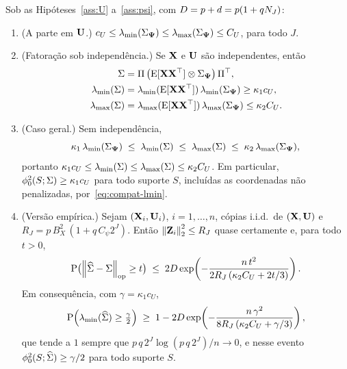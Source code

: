 \documentclass[11pt]{article}
\newcommand{\bPsi}{\boldsymbol{\Psi}}
\newcommand{\kron}{\otimes}
\newcommand{\lmin}{\lambda_{\min}}
\newcommand{\lmax}{\lambda_{\max}}
\newcommand{\opnorm}[1]{\left\lVert #1 \right\rVert_{\mathrm{op}}}
\begin{document}
\begin{proposition}
\label{prop:gram}
Sob as Hipóteses~\ref{ass:U} a~\ref{ass:psi}, com $D = p + d = p(1 + qN_{J})$:
\begin{enumerate}[label=\textup{(\roman*)}, leftmargin=*]
    \item \textup{(A parte em $\mathbf{U}$.)} $c_U \le \lmin(\Gram_{\bPsi}) \le \lmax(\Gram_{\bPsi}) \le C_U$, para todo $J$.
    \item \textup{(Fatoração sob independência.)} Se $\mathbf{X}$ e $\mathbf{U}$ são independentes, então
    \begin{align*}
        \Gram &= \Pi\,\bigl(\E[\bX\bX\T] \kron \Gram_{\bPsi}\bigr)\,\Pi\T , \\
        \lmin(\Gram) &= \lmin(\E[\bX\bX\T])\,\lmin(\Gram_{\bPsi}) \ge \kappa_1 c_U , \\
        \lmax(\Gram) &= \lmax(\E[\bX\bX\T])\,\lmax(\Gram_{\bPsi}) \le \kappa_2 C_U .
    \end{align*}
    \item \textup{(Caso geral.)} Sem independência,
    \[
        \kappa_1\, \lmin(\Gram_{\bPsi}) \;\le\; \lmin(\Gram) \;\le\; \lmax(\Gram) \;\le\; \kappa_2\, \lmax(\Gram_{\bPsi}),
    \]
    portanto $\kappa_1 c_U \le \lmin(\Gram) \le \lmax(\Gram) \le \kappa_2 C_U$.
    Em particular, $\phi_{0}^2(S; \Sigma) \ge \kappa_1 c_U$ para todo suporte $S$, incluídas as coordenadas
    não penalizadas, por~\eqref{eq:compat-lmin}.
    \item \textup{(Versão empírica.)} Sejam $(\mathbf{X}_i, \mathbf{U}_i)$, $i = 1, \ldots, n$, cópias i.i.d.\ de $(\mathbf{X}, \mathbf{U})$ e
    $R_J = p\,B_X^2\,(1 + q\,C_\psi 2^{J})$. Então $\left\lVert \mathbf{Z}_i \right\rVert_2^2 \le R_J$ quase certamente e, para todo $t > 0$,
    \[
        \Prob\bigl(\opnorm{\Gramhat - \Gram} \ge t\bigr)
        \;\le\; 2D \exp\!\left( - \frac{n\,t^2}{2R_J\,(\kappa_2 C_U + 2t/3)} \right) .
    \]
    Em consequência, com $\gamma = \kappa_1 c_U$,
    \[
        \Prob\Bigl( \lmin(\Gramhat) \ge \tfrac{\gamma}{2} \Bigr)
        \;\ge\; 1 - 2D\exp\!\left( - \frac{n\,\gamma^2}{8R_J\,(\kappa_2 C_U + \gamma/3)} \right) ,
    \]
    que tende a $1$ sempre que $p\,q\,2^{J}\log(p\,q\,2^{J})/n \to 0$,
    e nesse evento $\phi_{0}^2(S; \widehat{\Sigma}) \ge \gamma/2$ para todo suporte $S$.
\end{enumerate}
\end{proposition}
\end{document}
